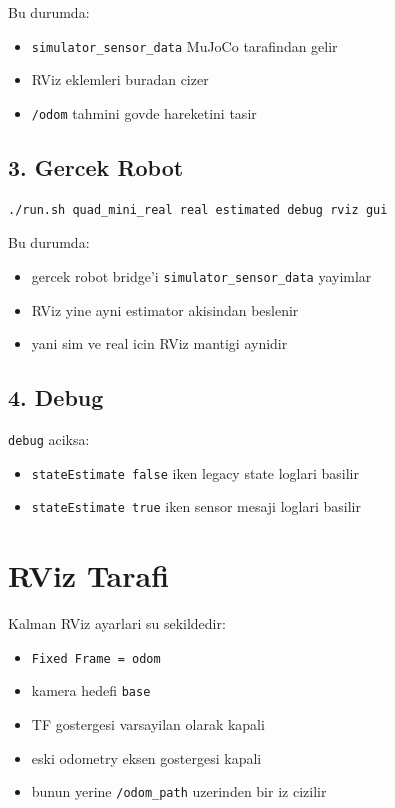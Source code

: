 \documentclass[11pt]{article}
\begin{document}
Bu durumda:
\begin{itemize}
  \item \texttt{simulator\_sensor\_data} MuJoCo tarafindan gelir
  \item RViz eklemleri buradan cizer
  \item \texttt{/odom} tahmini govde hareketini tasir
\end{itemize}

\subsection*{3. Gercek Robot}
\begin{verbatim}
./run.sh quad_mini_real real estimated debug rviz gui
\end{verbatim}

Bu durumda:
\begin{itemize}
  \item gercek robot bridge'i \texttt{simulator\_sensor\_data} yayimlar
  \item RViz yine ayni estimator akisindan beslenir
  \item yani sim ve real icin RViz mantigi aynidir
\end{itemize}

\subsection*{4. Debug}
\texttt{debug} aciksa:
\begin{itemize}
  \item \texttt{stateEstimate false} iken legacy state loglari basilir
  \item \texttt{stateEstimate true} iken sensor mesaji loglari basilir
\end{itemize}

\section*{RViz Tarafi}
Kalman RViz ayarlari su sekildedir:
\begin{itemize}
  \item \texttt{Fixed Frame = odom}
  \item kamera hedefi \texttt{base}
  \item TF gostergesi varsayilan olarak kapali
  \item eski odometry eksen gostergesi kapali
  \item bunun yerine \texttt{/odom\_path} uzerinden bir iz cizilir
\end{itemize}
\end{document}
